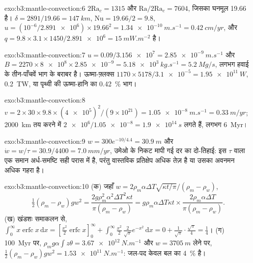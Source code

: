 \begin{solution}{exo:b3:mantle-convection:6}
$2\mathrm{Ra}_c = 1315$ और $\mathrm{Ra}/2\mathrm{Ra}_c = 7604$, जिसका घनमूल
19.66 है। $\delta = 2891/19.66 = \qty{147}{km}$, $\mathrm{Nu} = 19.66/2 =
9.8$, $u = (10^{-6}/\num{2.891e6})\times19.66^2 = \qty{1.34e-10}{m.s^{-1}} =
\qty{0.42}{cm/yr}$, और $q = 9.8\times3.1\times1450/\num{2.891e6} =
\qty{15}{mW.m^{-2}}$ है।
\end{solution}

\begin{solution}{exo:b3:mantle-convection:7}
$u = 0.09/\num{3.156e7} = \qty{2.85e-9}{m.s^{-1}}$ और $B = 2270\times\num{8e8}
\times\num{2.85e-9} = \qty{5.18e3}{kg.s^{-1}} = \qty{5.2}{Mg/s}$, लगभग
हवाई के तीन-पाँचवें भाग के बराबर है। ऊष्मा-फ़्लक्स $1170\times5178/\num{3.1e-5} =
\qty{1.95e11}{W}$, \qty{0.2}{TW}, या पृथ्वी की ऊष्मा-हानि का
\qty{0.42}{\percent} भाग।
\end{solution}

\begin{solution}{exo:b3:mantle-convection:8}
$v = 2\times30\times9.8\times(\num{4e5})^2/(9\times10^{21}) =
\qty{1.05e-8}{m.s^{-1}} = \qty{0.33}{m/yr}$; \qty{2000}{km} तय करने में
$\num{2e6}/\num{1.05e-8} = \qty{1.9e14}{s}$ लगते हैं, लगभग \qty{6}{Myr}।
\end{solution}

\begin{solution}{exo:b3:mantle-convection:9}
$w = 300e^{-10/4.4} = \qty{30.9}{m}$ और $\dot w = w/\tau = 30.9/4400 =
\qty{7.0}{mm/yr}$, उमेओ के निकट मापी गई दर का दो-तिहाई:
इस $\tau$ वाला एक समान अर्ध-समष्टि सही परास में है, परंतु वास्तविक प्रतिक्षेप
अधिक तेज़ है या उसका अवनमन अधिक गहरा है।
\end{solution}

\begin{solution}{exo:b3:mantle-convection:10}
(क) जहाँ $w = 2\rho_m\alpha\Delta T\sqrt{\kappa t/\pi}/(\rho_m - \rho_w)$,
\[
  \tfrac12(\rho_m - \rho_w)gw^2 = \frac{2g\rho_m^2\alpha^2\Delta T^2\kappa t}
  {\pi(\rho_m - \rho_w)} = g\rho_m\alpha\Delta T\kappa t\times
  \frac{2\rho_m\alpha\Delta T}{\pi(\rho_m - \rho_w)} .
\] (ख) खंडशः समाकलन से,
$\int_0^\infty x\operatorname{erfc}x\,\mathrm dx = [\tfrac{x^2}2\operatorname{erfc}
x]_0^\infty + \int_0^\infty\tfrac{x^2}2\,\tfrac2{\sqrt\pi}e^{-x^2}\,\mathrm dx =
0 + \tfrac1{\sqrt\pi}\cdot\tfrac{\sqrt\pi}4 = \tfrac14$। (ग) \qty{100}{Myr} पर,
$\rho_mg\alpha\int z\theta = \qty{3.67e12}{N.m^{-1}}$ और $w =
\qty{3705}{m}$ लेने पर, $\tfrac12(\rho_m - \rho_w)gw^2 = \qty{1.53e11}{N.m^{-1}}$: जल-पद
केवल बल का \qty{4}{\percent} है।
\end{solution}

